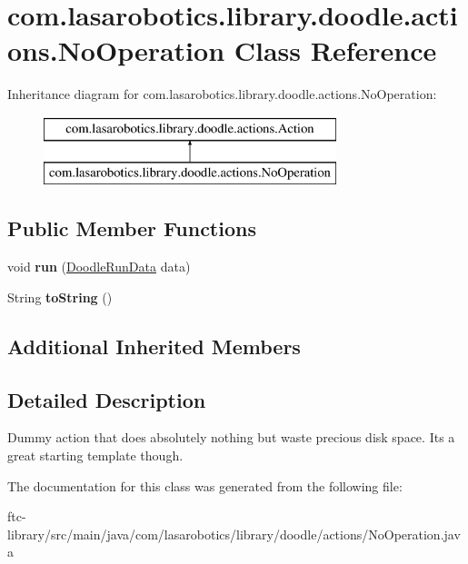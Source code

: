 \hypertarget{classcom_1_1lasarobotics_1_1library_1_1doodle_1_1actions_1_1_no_operation}{}\section{com.\+lasarobotics.\+library.\+doodle.\+actions.\+No\+Operation Class Reference}
\label{classcom_1_1lasarobotics_1_1library_1_1doodle_1_1actions_1_1_no_operation}
Inheritance diagram for com.\+lasarobotics.\+library.\+doodle.\+actions.\+No\+Operation\+:\begin{figure}[H]
\begin{center}
\leavevmode
\includegraphics[height=2.000000cm]{classcom_1_1lasarobotics_1_1library_1_1doodle_1_1actions_1_1_no_operation}
\end{center}
\end{figure}
\subsection*{Public Member Functions}
\begin{DoxyCompactItemize}
\item 
\hypertarget{classcom_1_1lasarobotics_1_1library_1_1doodle_1_1actions_1_1_no_operation_a3c33ee348e3e3409d973daf966233a0a}{}void {\bfseries run} (\hyperlink{classcom_1_1lasarobotics_1_1library_1_1doodle_1_1_doodle_run_data}{Doodle\+Run\+Data} data)\label{classcom_1_1lasarobotics_1_1library_1_1doodle_1_1actions_1_1_no_operation_a3c33ee348e3e3409d973daf966233a0a}

\item 
\hypertarget{classcom_1_1lasarobotics_1_1library_1_1doodle_1_1actions_1_1_no_operation_a930ef51adf54ddd588715e30e14a06e9}{}String {\bfseries to\+String} ()\label{classcom_1_1lasarobotics_1_1library_1_1doodle_1_1actions_1_1_no_operation_a930ef51adf54ddd588715e30e14a06e9}

\end{DoxyCompactItemize}
\subsection*{Additional Inherited Members}


\subsection{Detailed Description}
Dummy action that does absolutely nothing but waste precious disk space. It\textquotesingle{}s a great starting template though. 

The documentation for this class was generated from the following file\+:\begin{DoxyCompactItemize}
\item 
ftc-\/library/src/main/java/com/lasarobotics/library/doodle/actions/No\+Operation.\+java\end{DoxyCompactItemize}
